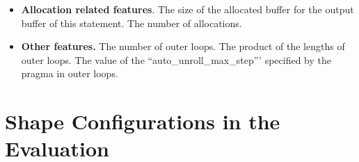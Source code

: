 \begin{itemize}
    \begin{itemize}
        \item \textbf{Access type}. The type of access (read, write, read + write).
        \item \textbf{Bytes}. The total number of bytes accessed by this statement.
        \item \textbf{Unique bytes}. The total number of unique bytes accessed by this statement.
        \item \textbf{Lines}. The total number of cache lines accessed by this statement.
        \item \textbf{Unique lines}. The total number of unique cache lines accessed by this statement.
        \item \textbf{Reuse type}. The type of data reuse (LoopMultipleRead, SerialMultipleRead, NoReuse).
        \item \textbf{Reuse distance}.  The distance between data reuse in terms of number of for loop iterations and total accessed bytes.
        \item \textbf{Reuse counter}. The number of happening of data reuse.
        \item \textbf{Stride}.  The stride of access.
        \item \textbf{Accessed bytes divided by reuse}. We compute the following values: 
        $\frac{\text{Bytes}}{\text{Reuse counter}}$,
        $\frac{\text{Unique bytes}}{\text{Reuse counter}}$,
        $\frac{\text{Lines}}{\text{Reuse counter}}$,
        $\frac{\text{Unique lines}}{\text{Reuse counter}}$.
    \end{itemize}
    
    \item \textbf{Allocation related features}. The size of the allocated buffer for the output buffer of this statement. The number of allocations.
    \item \textbf{Other features.} The number of outer loops. The product of the lengths of outer loops. The value of the ``auto\_unroll\_max\_step''' specified by the pragma in outer loops.
\end{itemize}



\section{Shape Configurations in the Evaluation}
\label{sec:shape-eval}


